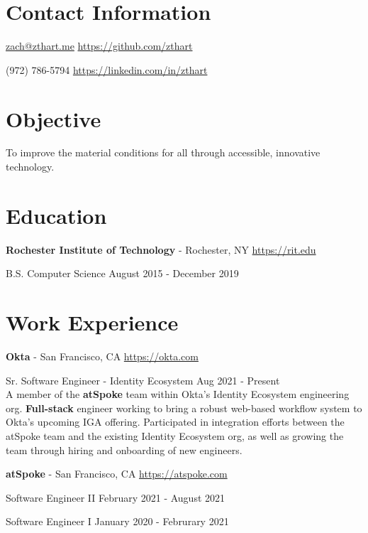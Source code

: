 \documentclass[margin,line]{resume}
\newcommand{\rurl}[1]{\hfill {\footnotesize \url{#1}}}
\newcommand{\rdate}[1]{\hfill {\small #1}}
\begin{document}

\begin{resume}
\section{\mysidestyle Contact Information}
	\begin{asparablank}
		\item \href{mailto:zach@zthart.me}{zach@zthart.me} \rurl{https://github.com/zthart}
		\item (972) 786-5794 \rurl{https://linkedin.com/in/zthart}
    	\end{asparablank}

\section{\mysidestyle Objective}
	\begin{asparablank}
	\item To improve the material conditions for all through accessible, innovative technology.
        \normalsize
	\end{asparablank}

\section{\mysidestyle Education}
	\begin{asparablank}
	\item{\bf Rochester Institute of Technology} - Rochester, NY \rurl{https://rit.edu}
		\small \item B.S. Computer Science \rdate{August 2015 - December 2019}
	\end{asparablank}

\section{\mysidestyle Work Experience}
	\begin{asparablank}

    \item{\bf Okta} - San Francisco, CA \rurl{https://okta.com}
    \small \item Sr. Software Engineer - Identity Ecosystem \hfill Aug 2021 - Present \\

    \small A member of the \textbf{atSpoke} team within Okta's Identity Ecosystem engineering org.
    \small \textbf{Full-stack} engineer working to bring a robust web-based workflow system to Okta's upcoming IGA offering.
    \small Participated in integration efforts between the atSpoke team and the existing Identity Ecosystem org, as well as growing the team through hiring and onboarding of new engineers.
    \normalsize
    \\
    \item{\bf atSpoke} - San Francisco, CA \rurl{https://atspoke.com}
    \small \item Software Engineer II \hfill February 2021 - August 2021
    \small \item Software Engineer I \hfill January 2020 - Februrary 2021 \\


\end{asparablank}
\end{resume}
\end{document}
